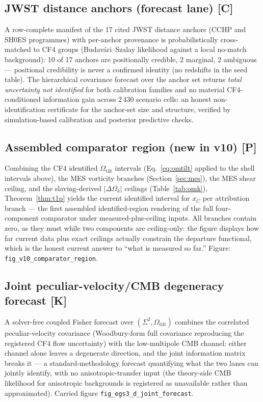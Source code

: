 \documentclass[10pt]{article}
\theoremstyle{definition}
\newcommand{\code}[1]{\texttt{\small #1}}
\newcommand{\tier}[1]{\textbf{[#1]}}
\newcommand{\OmT}{\Omega_{\mathrm{tilt}}}
\newcommand{\dOk}{\Delta\Omega_{k}}
\begin{document}
\subsection{JWST distance anchors (forecast lane) \tier{C}}

A row-complete manifest of the 17 cited JWST distance anchors
(CCHP and SH0ES programmes) with per-anchor provenance is
probabilistically cross-matched to CF4 groups (Budav\'ari--Szalay
likelihood against a local no-match background): 10 of 17 anchors are
positionally credible, 2 marginal, 2 ambiguous --- positional
credibility is never a confirmed identity (no redshifts in the seed
table). The hierarchical covariance forecast over the anchor set
returns \emph{total uncertainty not identified} for both calibration
families and no material CF4-conditioned information gain across
2\,430 scenario cells: an honest non-identification certificate for
the anchor-set size and structure, verified by simulation-based
calibration and posterior predictive checks.

\subsection{Assembled comparator region (new in v10) \tier{P}}

Combining the CF4 identified $\OmT$ intervals
(Eq.~\ref{eq:omtilt} applied to the shell intervals above), the MES
vorticity branches (Section~\ref{sec:mes}), the MES shear ceiling,
and the slaving-derived $|\dOk|$ ceilings (Table~\ref{tab:omk}),
Theorem~\ref{thm:t1p} yields the current identified interval for
$x_C$ per attribution branch --- the first assembled
identified-region rendering of the full four-component comparator
under measured-plus-ceiling inputs. All branches contain zero, as
they must while two components are ceiling-only: the figure displays
how far current data plus exact ceilings actually constrain the
departure functional, which is the honest current answer to ``what is
measured so far.''
Figure: \code{fig\_v10\_comparator\_region}.

\subsection{Joint peculiar-velocity/CMB degeneracy forecast \tier{K}}
\label{sec:jointforecast}

A solver-free coupled Fisher forecast over $(\Sigma^2, \OmT)$
combines the correlated peculiar-velocity covariance (Woodbury-form
full covariance reproducing the registered CF4 flow uncertainty) with
the low-multipole CMB channel: either channel alone leaves a
degenerate direction, and the joint information matrix breaks it ---
a standard-methodology forecast quantifying what the two lanes can
jointly identify, with no anisotropic-transfer input (the
theory-side CMB likelihood for anisotropic backgrounds is registered
as unavailable rather than approximated). Carried figure
\code{fig\_egs3\_d\_joint\_forecast}.
\end{document}
